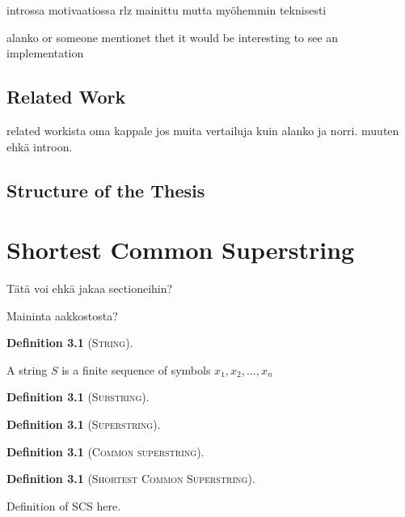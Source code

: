\documentclass[english,twoside,censored,csm,algorithms-track-2020]{HYthesisML}
\theoremstyle{plain}
\theoremstyle{definition}
\newtheorem{definition}[equation]{Definition}
\begin{document}
  introssa motivaatiossa rlz mainittu mutta myöhemmin teknisesti
  
  alanko or someone mentionet thet it would be interesting to see an implementation

  \section{Related Work}

  related workista oma kappale jos muita vertailuja kuin alanko ja norri. muuten ehkä introon.
  
  \section{Structure of the Thesis}

\chapter {Shortest Common Superstring}

Tätä voi ehkä jakaa sectioneihin?

Maininta aakkostosta?

\begin{definition}[\textsc{String}]~\label{def-string}
  
A string $S$ is a finite sequence of symbols ${x_1,x_2,...,x_n}$

\end{definition}

\begin{definition}[\textsc{Substring}]~\label{def-substring}

\end{definition}

\begin{definition}[\textsc{Superstring}]~\label{def-superstring}

\end{definition}

\begin{definition}[\textsc{Common superstring}]~\label{def-cs}

\end{definition}

  \begin{definition}[\textsc{Shortest Common Superstring}]~\label{def-scs}

  Definition of SCS here.
  
  \end{definition}
\end{document}
